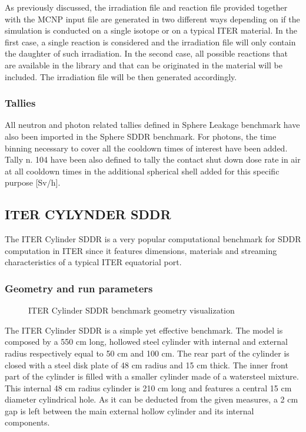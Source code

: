 \documentclass[letterpaper,10pt,english]{sphinxmanual}
\let\sphinxpxdimen\pdfpxdimen\else\newdimen\sphinxpxdimen
\begin{document}
As previously discussed, the irradiation file and reaction file provided together with the
MCNP input file are generated in two different ways depending on if the simulation is
conducted on a single isotope or on a typical ITER material. In the first case, a single
reaction is considered and the irradiation file will only contain the daughter of such irradiation.
In the second case, all possible reactions that are available in the library and that can be
originated in the material will be included. The irradiation file will be then generated accordingly.


\subsubsection{Tallies}
\label{\detokenize{usage/benchmarks:id8}}
All neutron and photon related tallies defined in Sphere Leakage benchmark have also been imported
in the Sphere SDDR benchmark. For photons, the time binning necessary to cover all the cool\sphinxhyphen{}down
times of interest have been added. Tally n. 104 have been also defined to tally the contact shut
down dose rate in air at all cool\sphinxhyphen{}down times in the additional spherical shell added for this
specific purpose {[}Sv/h{]}.


\subsection{ITER CYLYNDER SDDR}
\label{\detokenize{usage/benchmarks:iter-cylynder-sddr}}
The ITER Cylinder SDDR is a very popular computational benchmark for
SDDR computation in ITER since it features dimensions, materials and
streaming characteristics of a typical ITER equatorial port.


\subsubsection{Geometry and run parameters}
\label{\detokenize{usage/benchmarks:id9}}
\begin{figure}[htbp]
\centering
\capstart

\noindent\sphinxincludegraphics[width=600\sphinxpxdimen]{{cylSDDR}.png}
\caption{ITER Cylinder SDDR benchmark geometry visualization}\label{\detokenize{usage/benchmarks:id28}}\end{figure}

The ITER Cylinder SDDR is a simple yet effective benchmark. The model
is composed by a 550 cm long, hollowed steel cylinder with internal and
external radius respectively equal to 50 cm and 100 cm. The rear part of
the cylinder is closed with a steel disk plate of 48 cm radius and 15 cm thick.
The inner front part of the cylinder is filled with a smaller cylinder made
of a water\sphinxhyphen{}steel mixture. This internal 48 cm radius cylinder is 210 cm long
and features a central 15 cm diameter cylindrical hole. As it can be deducted
from the given measures, a 2 cm gap is left between the main external hollow
cylinder and its internal components.
\end{document}
